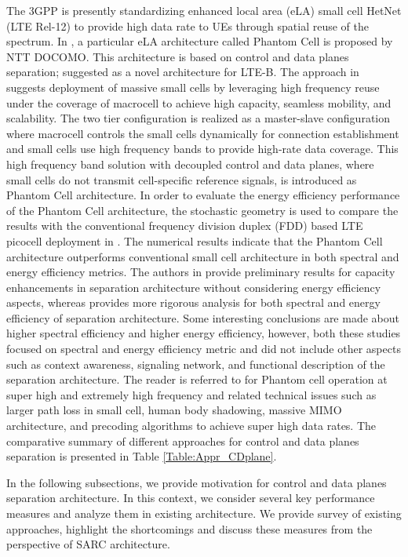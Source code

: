 \documentclass[article,10pt,twocolumn]{IEEEtran}
\begin{document}
The 3GPP is presently standardizing enhanced local area (eLA) small cell HetNet (LTE Rel-12) to provide high data rate to UEs through spatial reuse of the spectrum. In \citep{6477646}, a particular eLA architecture called Phantom Cell is proposed by NTT DOCOMO. This architecture is based on control and data planes separation; suggested as a novel architecture for LTE-B. The approach in \citep{6477646} suggests deployment of massive small cells by leveraging high frequency reuse under the coverage of macrocell to achieve high capacity, seamless mobility, and scalability. The two tier configuration is realized as a master-slave configuration where macrocell controls the small cells dynamically for connection establishment and small cells use high frequency bands to provide high-rate data coverage. This high frequency band solution with decoupled control and data planes, where small cells do not transmit cell-specific reference signals, is introduced as Phantom Cell architecture. In order to evaluate the energy efficiency performance of the Phantom Cell architecture, the stochastic geometry is used to compare the results with the conventional frequency division duplex (FDD) based LTE picocell deployment in \citep{6554746}. The numerical results indicate that the Phantom Cell architecture outperforms conventional small cell architecture in both spectral and energy efficiency metrics. The authors in \citep{6477646} provide preliminary results for capacity enhancements in separation architecture without considering energy efficiency aspects, whereas \citep{6554746} provides more rigorous analysis for both spectral and energy efficiency of separation architecture. Some interesting conclusions are made about higher spectral efficiency and higher energy efficiency, however, both these studies focused on spectral and energy efficiency metric and did not include other aspects such as context awareness, signaling network, and functional description of the separation architecture. The reader is referred to \citep{7067574, 6848637} for Phantom cell operation at super high and extremely high frequency and related technical issues such as larger path loss in small cell, human body shadowing, massive MIMO architecture, and precoding algorithms to achieve super high data rates. The comparative summary of different approaches for control and data planes separation is presented in Table \ref{Table:Appr_CDplane}.

In the following subsections, we provide motivation for control and data planes separation architecture. In this context, we consider several key performance measures and analyze them in existing architecture. We provide survey of existing approaches, highlight the shortcomings and discuss these measures from the perspective of SARC architecture.
\end{document}
